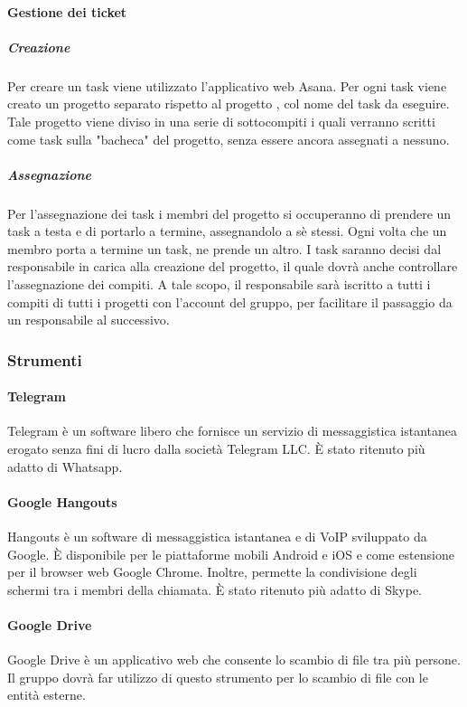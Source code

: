  \paragraph{Gestione dei ticket}
 \subparagraph{Creazione}
Per creare un task viene utilizzato l'applicativo web Asana. Per ogni task viene creato un progetto separato rispetto al progetto \PROGETTO{}, col nome del task da eseguire. Tale progetto viene diviso in una serie di sottocompiti i quali verranno scritti come task sulla "bacheca" del
progetto, senza essere ancora assegnati a nessuno.
 \subparagraph{Assegnazione}
 Per l'assegnazione dei task i membri del progetto si occuperanno
di prendere un task a testa e di portarlo a termine, assegnandolo a sè stessi. Ogni
volta che un membro porta a termine un task, ne prende un altro. I task
saranno decisi dal responsabile in carica alla creazione del progetto, il quale
dovrà anche controllare l'assegnazione dei compiti. A tale scopo,
il responsabile sarà iscritto a tutti i compiti di tutti i progetti con l'account del gruppo,
per facilitare il passaggio da un responsabile al successivo.
\subsubsection{Strumenti}
 \paragraph{Telegram}
 Telegram è un software libero che fornisce un servizio di messaggistica istantanea erogato senza fini di lucro dalla società Telegram LLC. È stato ritenuto più adatto di Whatsapp.
 \paragraph{Google Hangouts}
 Hangouts è un software di messaggistica istantanea e di VoIP   sviluppato da Google. È disponibile per le piattaforme mobili Android e iOS e come estensione per il browser web Google Chrome. Inoltre, permette la condivisione degli schermi tra i membri della chiamata. È stato ritenuto più adatto di Skype.
 \paragraph{Google Drive}
 Google Drive è un applicativo web che consente lo scambio di file tra più persone. Il gruppo \GRUPPO dovrà far utilizzo di questo strumento per lo scambio di file con le entità esterne.
